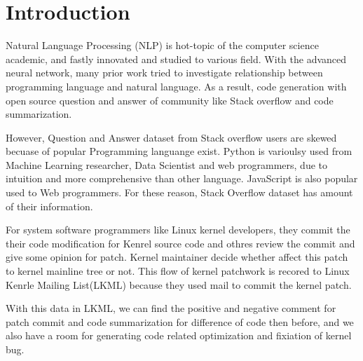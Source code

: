 \section{Introduction}
\noindent
Natural Language Processing (NLP) is hot-topic of the computer science academic,
and fastly innovated and studied to various field. With the advanced neural
network, many prior work tried to investigate relationship between programming
language and natural language.
As a result, code generation with open source question and answer of community
like Stack overflow and code summarization.

However, Question and Answer dataset from Stack overflow users are skewed
becuase of popular Programming languange exist. Python is varioulsy used from
Machine Learning researcher, Data Scientist and web programmers, due to
intuition and more comprehensive than other language. JavaScript is also popular 
used to Web programmers. For these reason, Stack Overflow dataset has amount of
their information.

For system software programmers like Linux kernel developers, they commit the
their code modification for Kenrel source code and othres review the commit
and give some opinion for patch. Kernel maintainer decide whether affect this
patch to kernel mainline tree or not. This flow of kernel patchwork is recored
to Linux Kenrle Mailing List(LKML) because they used mail to commit the kernel
patch.

With this data in LKML, we can find the positive and negative comment for patch
commit and code summarization for difference of code then before, and we also
have a room for generating code related optimization and fixiation of kernel
bug.
